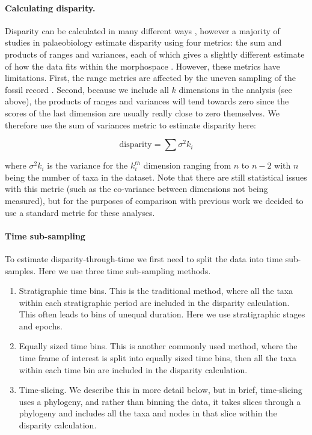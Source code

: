 \documentclass[12pt,a4paper]{article}
\begin{document}
\paragraph{Calculating disparity.}
\label{disparity_calc}
Disparity can be calculated in many different ways \citep[e.g.][]{Wills1994,Ciampaglio2004,thorneresetting2011,hopkinsdecoupling2013,huang2015origins}, however a majority of studies in palaeobiology estimate disparity using four metrics: the sum and products of ranges and variances, each of which gives a slightly different estimate of how the data fits within the morphospace \citep{Foote01071994,Wills1994,brusatte50,Brusatte12092008,cisneros2010,thorneresetting2011,prentice2011,brusattedinosaur2012,toljagictriassic-jurassic2013,ruta2013,bentonmodels2014,bensonfaunal2014}.
However, these metrics have limitations. 
First, the range metrics are affected by the uneven sampling of the fossil record \citep{Butler2012}.
Second, because we include all $k$ dimensions in the analysis (see above), the products of ranges and variances will tend towards zero since the scores of the last dimension are usually really close to zero themselves. 
We therefore use the sum of variances metric to estimate disparity here:

\begin{equation}
\text{disparity} = \sum\sigma^{2}{k_i}
\end{equation}

\noindent where $\sigma^{2}{k_i}$ is the variance for the $k_i^{th}$ dimension ranging from $n$ to $n-2$ with $n$ being the number of taxa in the dataset.
Note that there are still statistical issues with this metric (such as the co-variance between dimensions not being measured), but for the purposes of comparison with previous work we decided to use a standard metric for these analyses.

\paragraph{Time sub-sampling} 
\label{time_sub-samples}

To estimate disparity-through-time we first need to split the data into time sub-samples.
Here we use three time sub-sampling methods.

\begin{enumerate}
  \item Stratigraphic time bins. This is the traditional method, where all the taxa within each stratigraphic period are included in the disparity calculation. This often leads to bins of unequal duration. Here we use stratigraphic stages and epochs.
  \item Equally sized time bins. This is another commonly used method, where the time frame of interest is split into equally sized time bins, then all the taxa within each time bin are included in the disparity calculation. 
  \item Time-slicing. We describe this in more detail below, but in brief, time-slicing uses a phylogeny, and rather than binning the data, it takes slices through a phylogeny and includes all the taxa and nodes in that slice within the disparity calculation. 
\end{enumerate}  
\end{document}

